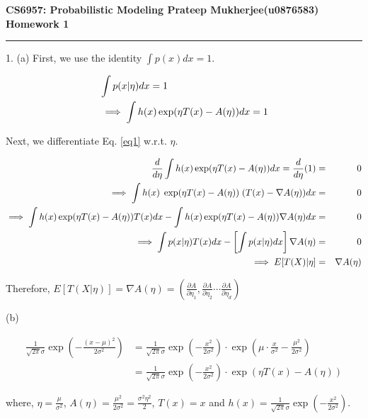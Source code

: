 \documentclass[11pt]{article}
\begin{document}
\thispagestyle{empty}
{\large{\bf CS6957: Probabilistic Modeling \hfill Prateep Mukherjee(u0876583)}}\\

{\LARGE{\bf Homework 1}}
\vspace{0.2\baselineskip}
\hrule

1. (a)  First, we use the identity $\int p(x) dx = 1$.

\begin{eqnarray}
 & \int p(x|\eta) dx = 1 \notag \\
& \implies \int h(x) \exp(\eta T(x) - A(\eta)) dx = 1
\label{eq1}
\end{eqnarray}

\par Next, we differentiate Eq. \ref{eq1} w.r.t. $\eta$.
\vspace{-8pt}

\begin{eqnarray}
  \frac{d}{d\eta}  \int h(x) \exp(\eta T(x) - A(\eta)) dx = \frac{d}{d\eta} (1) &=& 0 \notag \\
\implies \int h(x) \; \exp(\eta T(x) - A(\eta)) \; (T(x) - \nabla A(\eta)) dx &=& 0 \notag \\
 \implies \int h(x) \exp(\eta T(x) - A(\eta)) T(x) dx  \notag - \int h(x) \exp(\eta T(x) - A(\eta)) \nabla A(\eta) dx &=& 0  \notag \\
\implies \int p(x|\eta) T(x) dx - \left [ \int p(x|\eta) dx\right ] \nabla A(\eta) &=& 0 \notag \\
\implies E[T(X) | \eta]  &=& \nabla A(\eta) \notag
\end{eqnarray}

Therefore, $E[T(X| \eta)] = \nabla A(\eta) = \left ( \frac{\partial A}{\partial \eta_1}, \frac{\partial A}{\partial \eta_2} \cdots \frac{\partial A}{\partial \eta_d}\right ) $

\par (b) 

\begin{eqnarray*}
  \frac{1}{\sqrt{2\pi}\sigma} \exp(-\frac{(x-\mu)^2}{2\sigma^2}) &=
       \frac{1}{\sqrt{2\pi}\sigma} \exp(-\frac{x^2}{2\sigma^2}) \cdot \exp(\mu \cdot \frac{x}{\sigma^2} - \frac{\mu^2}{2\sigma^2}) \\
&= \frac{1}{\sqrt{2\pi}\sigma} \exp(-\frac{x^2}{2\sigma^2}) \cdot \exp(\eta T(x) - A(\eta))
\end{eqnarray*}

where, $\eta = \frac{\mu}{\sigma^2}$, $A(\eta) = \frac{\mu^2}{2\sigma^2} = \frac{\sigma^2 \eta^2}{2}$, $T(x) = x$ and $h(x) =  \frac{1}{\sqrt{2\pi}\sigma} \exp(-\frac{x^2}{2\sigma^2})$.
\end{document}
